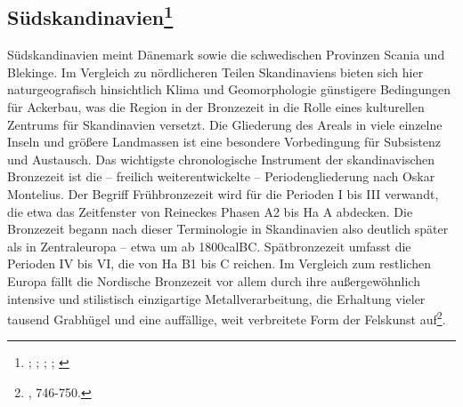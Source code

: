 \documentclass[openany,twoside,twocolumn]{book}
\let\rmarkdownfootnote\footnote%
\def\footnote{\protect\rmarkdownfootnote}
\begin{document}
\hypertarget{sudskandinavien}{%
\subsection[Südskandinavien]{\texorpdfstring{Südskandinavien\footnote{\textcite{ambrosiani_bronzezeit_1986};
  \textcite{levy_heterarchy_1995}; \textcite{thrane_scandinavia_2013};
  \textcite{victor_med_2002}; \textcite{wrigglesworth_bronze_2007}}}{Südskandinavien}}\label{sudskandinavien}}

Südskandinavien meint Dänemark sowie die schwedischen Provinzen Scania
und Blekinge. Im Vergleich zu nördlicheren Teilen Skandinaviens bieten
sich hier naturgeografisch hinsichtlich Klima und Geomorphologie
günstigere Bedingungen für Ackerbau, was die Region in der Bronzezeit in
die Rolle eines kulturellen Zentrums für Skandinavien versetzt. Die
Gliederung des Areals in viele einzelne Inseln und größere Landmassen
ist eine besondere Vorbedingung für Subsistenz und Austausch. Das
wichtigste chronologische Instrument der skandinavischen Bronzezeit ist
die -- freilich weiterentwickelte -- Periodengliederung nach Oskar
Montelius. Der Begriff Frühbronzezeit wird für die Perioden I bis III
verwandt, die etwa das Zeitfenster von Reineckes Phasen A2 bis Ha A
abdecken. Die Bronzezeit begann nach dieser Terminologie in Skandinavien
also deutlich später als in Zentraleuropa -- etwa um ab 1800calBC.
Spätbronzezeit umfasst die Perioden IV bis VI, die von Ha B1 bis C
reichen. Im Vergleich zum restlichen Europa fällt die Nordische
Bronzezeit vor allem durch ihre außergewöhnlich intensive und
stilistisch einzigartige Metallverarbeitung, die Erhaltung vieler
tausend Grabhügel und eine auffällige, weit verbreitete Form der
Felskunst auf\footnote{\textcite{thrane_scandinavia_2013}, 746-750.}.
\end{document}
